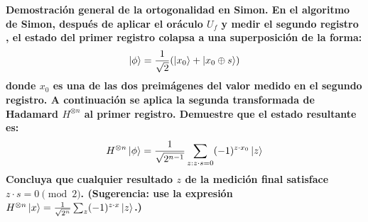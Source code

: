 {\bfseries
Demostración general de la ortogonalidad en Simon. En el algoritmo de Simon, después de aplicar el oráculo $U_f$ y medir el segundo registro , el estado del primer registro colapsa a una superposición de la forma:
$$ \ket{\phi} = \frac{1}{\sqrt{2}}(\ket{x_0} + \ket{x_0 \oplus s}) $$
donde $x_0$ es una de las dos preimágenes del valor medido en el segundo registro. A continuación se aplica la segunda transformada de Hadamard $H^{\otimes n}$ al primer registro. Demuestre que el estado resultante es:
$$H^{\otimes n} \ket{\phi} = \frac{1}{\sqrt{2^{n-1}}} \sum_{z:z\cdot s=0} (-1)^{z \cdot x_0} \ket{z} $$
Concluya que cualquier resultado $z$ de la medición final satisface $z \cdot s = 0 \pmod 2$. (Sugerencia: use la expresión $H^{\otimes n} \ket{x} = \frac{1}{\sqrt{2^n}} \sum_z (-1)^{z \cdot x} \ket{z}$.)}

\vspace{.5cm}

